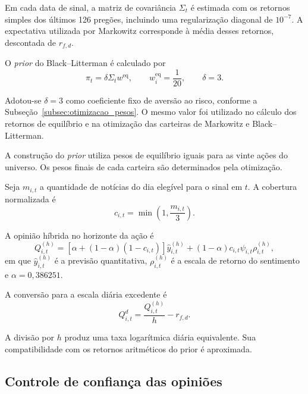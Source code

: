 Em cada data de sinal, a matriz de covariância
$\Sigma_t$ é estimada com os retornos simples dos
últimos 126 pregões, incluindo uma regularização
diagonal de $10^{-7}$. A expectativa utilizada por
Markowitz corresponde à média desses retornos,
descontada de $r_{f,d}$.

O \emph{prior} do Black--Litterman é calculado por
\begin{equation}
    \pi_t
    =
    \delta\Sigma_t w^{\mathrm{eq}},
    \qquad
    w_i^{\mathrm{eq}}=\frac{1}{20},
    \qquad
    \delta=3.
    \label{eq:prior_experimental}
\end{equation}

Adotou-se $\delta=3$ como coeficiente fixo de aversão
ao risco, conforme a Subseção~\ref{subsec:otimizacao_pesos}.
O mesmo valor foi utilizado no cálculo dos retornos de
equilíbrio e na otimização das carteiras de Markowitz
e Black--Litterman.

A construção do \emph{prior} utiliza pesos de equilíbrio
iguais para as vinte ações do universo. Os pesos finais
de cada carteira são determinados pela otimização.

Seja $m_{i,t}$ a quantidade de notícias do dia elegível
para o sinal em $t$. A cobertura normalizada é
\begin{equation}
c_{i,t}
=
\min\left(1,\frac{m_{i,t}}{3}\right).
\label{eq:cobertura_cap4}
\end{equation}

A opinião híbrida no horizonte da ação é
\begin{equation}
Q_{i,t}^{(h)}
=
\left[
\alpha+(1-\alpha)(1-c_{i,t})
\right]\widehat{y}_{i,t}^{(h)}
+
(1-\alpha)c_{i,t}
\psi_{i,t}\rho_{i,t}^{(h)},
\label{eq:q_hibrido_cap4}
\end{equation}
em que $\widehat{y}_{i,t}^{(h)}$ é a previsão quantitativa,
$\rho_{i,t}^{(h)}$ é a escala de retorno do sentimento
e $\alpha=0,386251$.

A conversão para a escala diária excedente é
\begin{equation}
Q_{i,t}^{d}
=
\frac{Q_{i,t}^{(h)}}{h}
-
r_{f,d}.
\label{eq:q_daily_cap4}
\end{equation}

A divisão por $h$ produz uma taxa logarítmica diária
equivalente. Sua compatibilidade com os retornos
aritméticos do prior é aproximada.

\subsection{Controle de confiança das opiniões}

